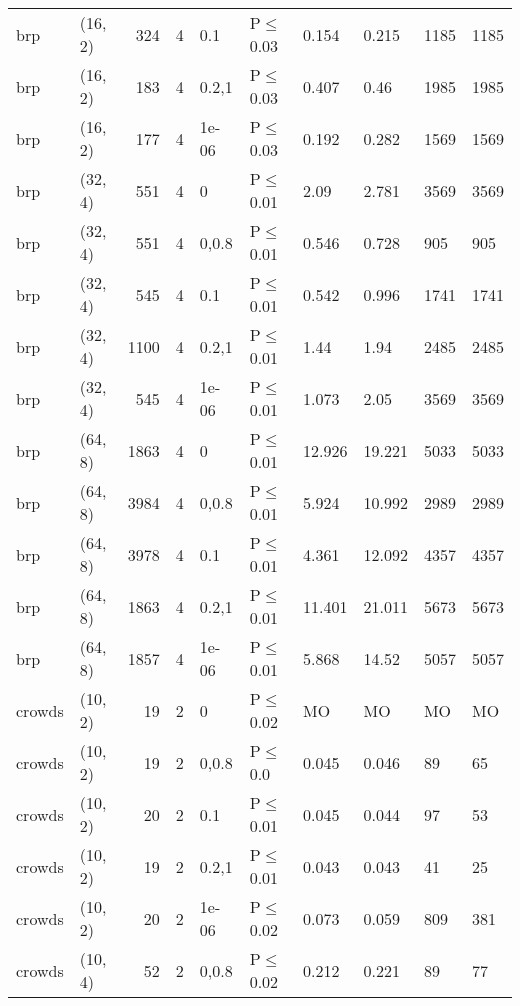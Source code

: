 \begin{longtable}{llrrllllll}
 brp           & (16, 2)  &    	324 &   4 & 0.1   & P$\leq$0.03  & 0.154  & 0.215   & 1185    & 1185 \\
 brp           & (16, 2)  &    	183 &   4 & 0.2,1 & P$\leq$0.03  & 0.407  & 0.46    & 1985    & 1985 \\
 brp           & (16, 2)  &    	177 &   4 & 1e-06 & P$\leq$0.03  & 0.192  & 0.282   & 1569    & 1569 \\
 brp           & (32, 4)  &    	551 &   4 & 0     & P$\leq$0.01  & 2.09   & 2.781   & 3569    & 3569 \\
 brp           & (32, 4)  &    	551 &   4 & 0,0.8 & P$\leq$0.01  & 0.546  & 0.728   & 905     & 905  \\
 brp           & (32, 4)  &    	545 &   4 & 0.1   & P$\leq$0.01  & 0.542  & 0.996   & 1741    & 1741 \\
 brp           & (32, 4)  &   	1100 &   4 & 0.2,1 & P$\leq$0.01  & 1.44   & 1.94    & 2485    & 2485 \\
 brp           & (32, 4)  &    	545 &   4 & 1e-06 & P$\leq$0.01  & 1.073  & 2.05    & 3569    & 3569 \\
 brp           & (64, 8)  &   	1863 &   4 & 0     & P$\leq$0.01  & 12.926 & 19.221  & 5033    & 5033 \\
 brp           & (64, 8)  &   	3984 &   4 & 0,0.8 & P$\leq$0.01  & 5.924  & 10.992  & 2989    & 2989 \\
 brp           & (64, 8)  &   	3978 &   4 & 0.1   & P$\leq$0.01  & 4.361  & 12.092  & 4357    & 4357 \\
 brp           & (64, 8)  &   	1863 &   4 & 0.2,1 & P$\leq$0.01  & 11.401 & 21.011  & 5673    & 5673 \\
 brp           & (64, 8)  &   	1857 &   4 & 1e-06 & P$\leq$0.01  & 5.868  & 14.52   & 5057    & 5057 \\
 crowds        & (10, 2)  &     	19 &   2 & 0     & P$\leq$0.02  & MO     & MO      & MO      & MO   \\
 crowds        & (10, 2)  &     	19 &   2 & 0,0.8 & P$\leq$0.0   & 0.045  & 0.046   & 89      & 65   \\
 crowds        & (10, 2)  &     	20 &   2 & 0.1   & P$\leq$0.01  & 0.045  & 0.044   & 97      & 53   \\
 crowds        & (10, 2)  &     	19 &   2 & 0.2,1 & P$\leq$0.01  & 0.043  & 0.043   & 41      & 25   \\
 crowds        & (10, 2)  &     	20 &   2 & 1e-06 & P$\leq$0.02  & 0.073  & 0.059   & 809     & 381  \\
 crowds        & (10, 4)  &     	52 &   2 & 0,0.8 & P$\leq$0.02  & 0.212  & 0.221   & 89      & 77   \\

\end{longtable}
